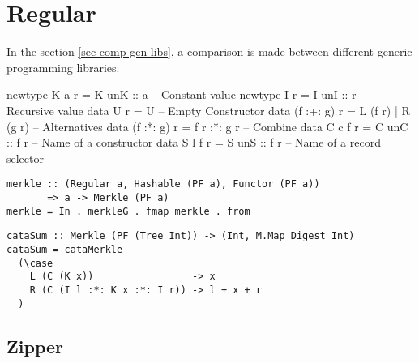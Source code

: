 \section{Regular}

In the section \ref*{sec-comp-gen-libs}, a comparison is made between different generic programming libraries. 


\begin{haskell}
newtype K a r    = K { unK :: a}     -- Constant value
newtype I r      = I { unI :: r }    -- Recursive value
data U r         = U                 -- Empty Constructor
data (f :+: g) r = L (f r) | R (g r) -- Alternatives
data (f :*: g) r = f r :*: g r       -- Combine
data C c f r     = C { unC :: f r }  -- Name of a constructor
data S l f r     = S { unS :: f r }  -- Name of a record selector
\end{haskell}

\begin{verbatim}
merkle :: (Regular a, Hashable (PF a), Functor (PF a))
       => a -> Merkle (PF a)
merkle = In . merkleG . fmap merkle . from
\end{verbatim}

\begin{verbatim}
cataSum :: Merkle (PF (Tree Int)) -> (Int, M.Map Digest Int)
cataSum = cataMerkle
  (\case
    L (C (K x))                 -> x
    R (C (I l :*: K x :*: I r)) -> l + x + r
  )
\end{verbatim}

\subsection{Zipper}